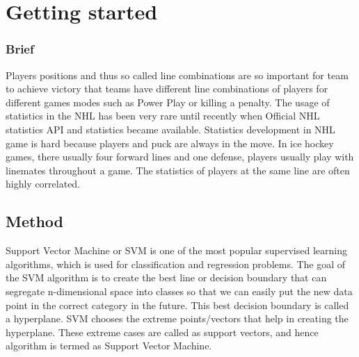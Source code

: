 \section{Getting started}
        \subsubsection{Brief}
            Players positions and thus so called line combinations are so important for team to achieve victory that
            teams have different line combinations of players for different games modes such as Power Play or killing a penalty. 
            The usage of statistics in the NHL has been very rare until recently when Official NHL statistics API and 
            statistics became available. Statistics development in NHL game is hard because players and puck are always in the move.
            In ice hockey games, there usually four forward lines and one defense, players usually play with linemates throughout a game. 
            The statistics of players at the same line are often highly correlated.
            
		\subsection{Method}
			Support Vector Machine or SVM is one of the most popular supervised learning algorithms, which is used for classification and regression problems. The goal of the SVM algorithm is to create the best line or decision boundary that can segregate n-dimensional space into classes so that we can easily put the new data point in the correct category in the future. This best decision boundary is called a hyperplane. SVM chooses the extreme points/vectors that help in creating the hyperplane. These extreme cases are called as support vectors, and hence algorithm is termed as Support Vector Machine. 

